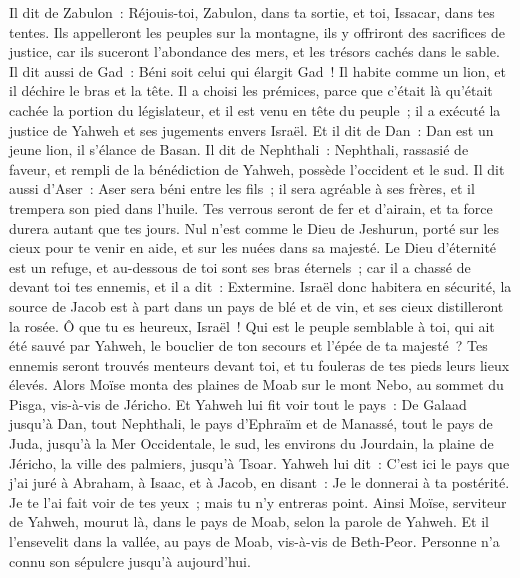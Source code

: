\begin{multicols}{2}
Il dit de Zabulon~: Réjouis-toi, Zabulon, dans ta sortie, et toi, Issacar, dans tes tentes.
Ils appelleront les peuples sur la montagne, ils y offriront des sacrifices de justice, car ils suceront l'abondance des mers, et les trésors cachés dans le sable.
Il dit aussi de Gad~: Béni soit celui qui élargit Gad~! Il habite comme un lion, et il déchire le bras et la tête.
Il a choisi les prémices, parce que c'était là qu'était cachée la portion du législateur, et il est venu en tête du peuple~; il a exécuté la justice de Yahweh et ses jugements envers Israël.
Et il dit de Dan~: Dan est un jeune lion, il s'élance de Basan.
Il dit de Nephthali~: Nephthali, rassasié de faveur, et rempli de la bénédiction de Yahweh, possède l'occident et le sud.
Il dit aussi d'Aser~: Aser sera béni entre les fils~; il sera agréable à ses frères, et il trempera son pied dans l'huile.
Tes verrous seront de fer et d'airain, et ta force durera autant que tes jours.
Nul n'est comme le Dieu de Jeshurun, porté sur les cieux pour te venir en aide, et sur les nuées dans sa majesté.
Le Dieu d'éternité est un refuge, et au-dessous de toi sont ses bras éternels~; car il a chassé de devant toi tes ennemis, et il a dit~: Extermine.
Israël donc habitera en sécurité, la source de Jacob est à part dans un pays de blé et de vin, et ses cieux distilleront la rosée.
Ô que tu es heureux, Israël~! Qui est le peuple semblable à toi, qui ait été sauvé par Yahweh, le bouclier de ton secours et l'épée de ta majesté~? Tes ennemis seront trouvés menteurs devant toi, et tu fouleras de tes pieds leurs lieux élevés.
\VerseOne{}Alors Moïse monta des plaines de Moab sur le mont Nebo, au sommet du Pisga, vis-à-vis de Jéricho. Et Yahweh lui fit voir tout le pays~: De Galaad jusqu'à Dan,
tout Nephthali, le pays d'Ephraïm et de Manassé, tout le pays de Juda, jusqu'à la Mer Occidentale,
le sud, les environs du Jourdain, la plaine de Jéricho, la ville des palmiers, jusqu'à Tsoar.
Yahweh lui dit~: C'est ici le pays que j'ai juré à Abraham, à Isaac, et à Jacob, en disant~: Je le donnerai à ta postérité. Je te l'ai fait voir de tes yeux~; mais tu n'y entreras point.
Ainsi Moïse, serviteur de Yahweh, mourut là, dans le pays de Moab, selon la parole de Yahweh.
Et il l'ensevelit dans la vallée, au pays de Moab, vis-à-vis de Beth-Peor. Personne n'a connu son sépulcre jusqu'à aujourd'hui.

\end{multicols}

